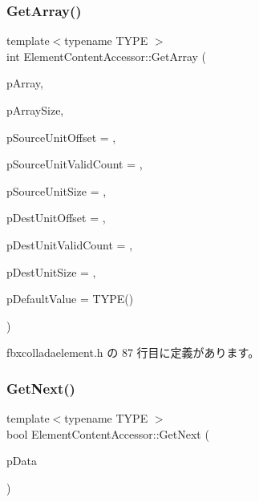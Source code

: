 \subsubsection{\texorpdfstring{Get\+Array()}{GetArray()}}
{\footnotesize\ttfamily template$<$typename T\+Y\+PE $>$ \\
int Element\+Content\+Accessor\+::\+Get\+Array (\begin{DoxyParamCaption}\item[{T\+Y\+PE $\ast$}]{p\+Array,  }\item[{int}]{p\+Array\+Size,  }\item[{int}]{p\+Source\+Unit\+Offset = {},  }\item[{int}]{p\+Source\+Unit\+Valid\+Count = {},  }\item[{int}]{p\+Source\+Unit\+Size = {},  }\item[{int}]{p\+Dest\+Unit\+Offset = {},  }\item[{int}]{p\+Dest\+Unit\+Valid\+Count = {},  }\item[{int}]{p\+Dest\+Unit\+Size = {},  }\item[{T\+Y\+PE}]{p\+Default\+Value = {\ttfamily TYPE()} }\end{DoxyParamCaption})\hspace{0.3cm}{\ttfamily [inline]}}



 fbxcolladaelement.\+h の 87 行目に定義があります。

\mbox{\label{struct_element_content_accessor_a5c066a3db4f929723fc1a78c11745154}} 
\subsubsection{\texorpdfstring{Get\+Next()}{GetNext()}}
{\footnotesize\ttfamily template$<$typename T\+Y\+PE $>$ \\
bool Element\+Content\+Accessor\+::\+Get\+Next (\begin{DoxyParamCaption}\item[{T\+Y\+PE $\ast$}]{p\+Data }\end{DoxyParamCaption})\hspace{0.3cm}{\ttfamily [inline]}}



